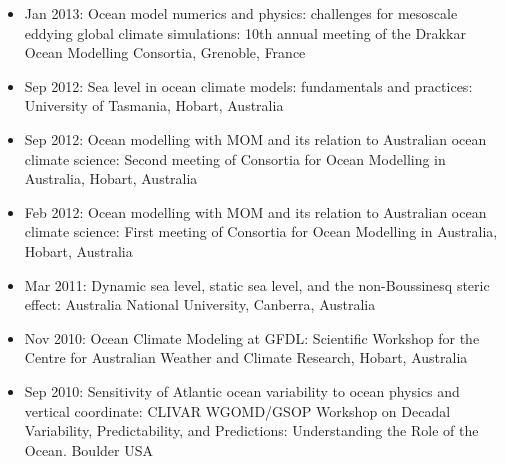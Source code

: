 \begin{itemize}[leftmargin=*]
\item Jan 2013: {\sc Ocean model numerics and physics: challenges for
    mesoscale eddying global climate simulations}: 10th annual meeting
  of the Drakkar Ocean Modelling Consortia, Grenoble, France

\item Sep 2012: {\sc Sea level in ocean climate models: fundamentals
    and practices}: University of Tasmania, Hobart, Australia

\item Sep 2012: {\sc Ocean modelling with MOM and its relation to
    Australian ocean climate science}: Second meeting of Consortia for
  Ocean Modelling in Australia, Hobart, Australia

\item Feb 2012: {\sc Ocean modelling with MOM and its relation to
    Australian ocean climate science}: First meeting of Consortia for
  Ocean Modelling in Australia, Hobart, Australia

\item Mar 2011: {\sc Dynamic sea level, static sea level, and the
    non-Boussinesq steric effect}: Australia National University,
  Canberra, Australia

\item Nov 2010:  {\sc Ocean Climate Modeling at GFDL}: Scientific
  Workshop for the Centre for Australian Weather and Climate Research,
  Hobart, Australia

\item Sep 2010:  {\sc Sensitivity of Atlantic ocean variability to
    ocean physics and vertical coordinate}: CLIVAR WGOMD/GSOP Workshop
  on Decadal Variability, Predictability, and Predictions:
  Understanding the Role of the Ocean. Boulder USA 




\end{itemize}
